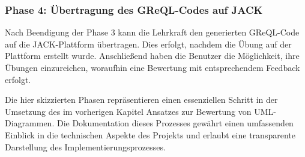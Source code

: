 \subsubsection{Phase 4: Übertragung des GReQL-Codes auf JACK}

Nach Beendigung der Phase 3 kann die Lehrkraft den generierten GReQL-Code auf die JACK-Plattform übertragen. Dies
erfolgt, nachdem die Übung auf der Plattform erstellt wurde. Anschließend haben die Benutzer die Möglichkeit, ihre
Übungen einzureichen, woraufhin eine Bewertung mit entsprechendem Feedback erfolgt.


Die hier skizzierten Phasen repräsentieren einen essenziellen Schritt in der Umsetzung des im vorherigen Kapitel Ansatzes
zur Bewertung von UML-Diagrammen. Die Dokumentation dieses Prozesses gewährt einen
umfassenden Einblick in die technischen Aspekte des Projekts und erlaubt eine transparente Darstellung des
Implementierungsprozesses.


